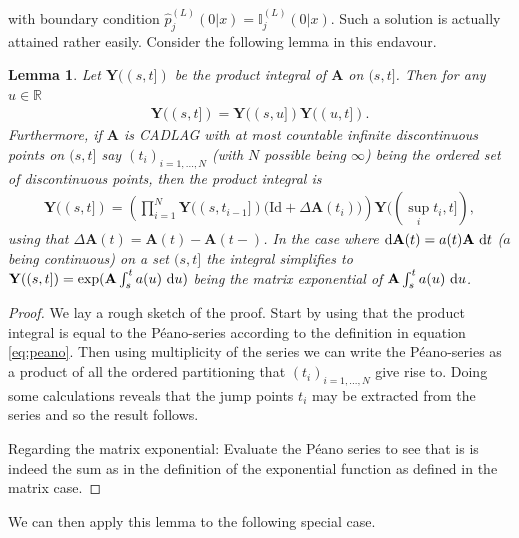 \documentclass[12pt,letter,twoside]{article}
\theoremstyle{plain}
\newtheorem{lemma}[theorem]{Lemma}
\theoremstyle{definition}
\theoremstyle{remark}
\begin{document}
with boundary condition $\hat p_j^{(L)}(0\vert x)=\mathbb I^{(L)}_j(0\vert  x)$. Such a solution is actually attained rather easily. Consider the following lemma in this endavour.
\begin{lemma}\label{lem:prodsol}
Let $\mathbf Y((s,t])$ be the product integral of $\mathbf A$ on $(s,t]$. Then for any $u\in\mathbb R$
\begin{align}\label{eq:4}
\mathbf Y((s,t])=\mathbf Y((s,u])\mathbf Y((u,t]).
\end{align}
Furthermore, if $\mathbf A$ is CADLAG with at most countable infinite discontinuous points on $(s,t]$ say $(t_i)_{i=1,...,N}$ (with $N$ possible being $\infty$) being the ordered set of discontinuous points, then the product integral is
\begin{align}
\mathbf Y((s,t])=\left(\prod_{i=1}^{N}\mathbf Y((s,t_{i-1}])\Big(\text{Id} + \Delta \mathbf A(t_i)\Big)\right)\mathbf Y((\sup_i t_i,t]),
\end{align}
using that $\Delta \mathbf A(t)=\mathbf A(t)-\mathbf A(t-)$. In the case where $\text d\mathbf A(t)=a(t)\mathbf A\ \text dt$ ($a$ being continuous) on a set $(s,t]$ the integral simplifies to $\mathbf Y((s,t])=\exp(\mathbf A\int_s^t a(u)\ \text du)$ being the matrix exponential of $\mathbf A\int_s^t a(u)\ \text du$.
\end{lemma}
\begin{proof}
We lay a rough sketch of the proof. Start by using that the product integral is equal to the Péano-series according to the definition in equation \ref{eq:peano}. Then using multiplicity of the series we can write the Péano-series as a product of all the ordered partitioning that $(t_i)_{i=1,...,N}$ give rise to. Doing some calculations reveals that the jump points $t_i$ may be extracted from the series and so the result follows.

Regarding the matrix exponential: Evaluate the Péano series to see that is is indeed the sum as in the definition of the exponential function as defined in the matrix case.
\end{proof}
We can then apply this lemma to the following special case.
\end{document}
